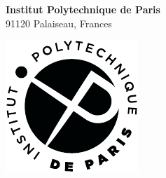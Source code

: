 \vspace*{5mm}

\begin{center}
\end{center}
  
\vfill


\begin{minipage}[b][][l]{60mm}
  \textbf{Institut Polytechnique de Paris}\\
  91120 Palaiseau, Frances
\end{minipage}
% 
\hfill
% 
\begin{minipage}[b][][r]{22mm}
  \includegraphics[width=\textwidth]{graphics/frontmatter/ip-paris-petit.pdf}
\end{minipage}

\restoregeometry